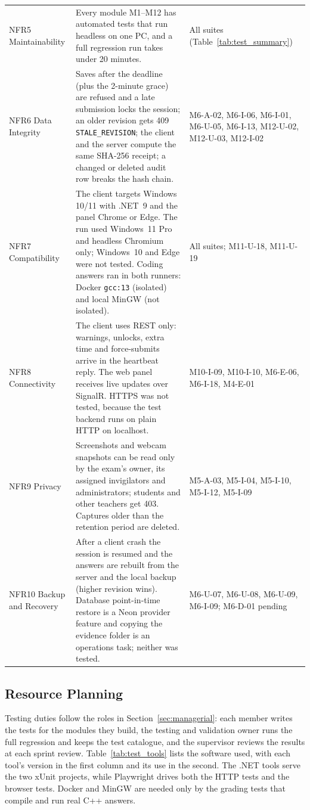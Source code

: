 {\begin{longtable}{@{}P{2.8cm}P{8.9cm}P{3.6cm}@{}}
NFR5 Maintainability & Every module M1--M12 has automated tests that run headless on one PC, and a full regression run takes under 20 minutes. & All suites (Table~\ref{tab:test_summary})\\
NFR6 Data Integrity & Saves after the deadline (plus the 2-minute grace) are refused and a late submission locks the session; an older revision gets 409 \texttt{STALE\_\allowbreak{}REVISION}; the client and the server compute the same SHA-256 receipt; a changed or deleted audit row breaks the hash chain. & M6-A-02, M6-I-06, M6-I-01, M6-U-05, M6-I-13, M12-U-02, M12-U-03, M12-I-02\\
NFR7 Compatibility & The client targets Windows 10/11 with .NET~9 and the panel Chrome or Edge. The run used Windows~11 Pro and headless Chromium only; Windows~10 and Edge were not tested. Coding answers ran in both runners: Docker \texttt{gcc:13} (isolated) and local MinGW (not isolated). & All suites; M11-U-18, M11-U-19\\
NFR8 Connectivity & The client uses REST only: warnings, unlocks, extra time and force-submits arrive in the heartbeat reply. The web panel receives live updates over SignalR. HTTPS was not tested, because the test backend runs on plain HTTP on localhost. & M10-I-09, M10-I-10, M6-E-06, M6-I-18, M4-E-01\\
NFR9 Privacy & Screenshots and webcam snapshots can be read only by the exam's owner, its assigned invigilators and administrators; students and other teachers get 403. Captures older than the retention period are deleted. & M5-A-03, M5-I-04, M5-I-10, M5-I-12, M5-I-09\\
NFR10 Backup and Recovery & After a client crash the session is resumed and the answers are rebuilt from the server and the local backup (higher revision wins). Database point-in-time restore is a Neon provider feature and copying the evidence folder is an operations task; neither was tested. & M6-U-07, M6-U-08, M6-U-09, M6-I-09; M6-D-01 pending\\
\end{longtable}}

\subsection{Resource Planning}
Testing duties follow the roles in Section~\ref{sec:managerial}: each member writes the tests for the modules they build, the testing and validation owner runs the full regression and keeps the test catalogue, and the supervisor reviews the results at each sprint review. Table~\ref{tab:test_tools} lists the software used, with each tool's version in the first column and its use in the second. The .NET tools serve the two xUnit projects, while Playwright drives both the HTTP tests and the browser tests. Docker and MinGW are needed only by the grading tests that compile and run real C++ answers.

